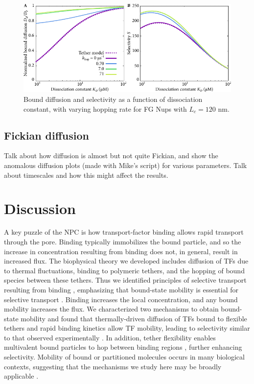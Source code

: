 \begin{figure}[h]
\centering
\includegraphics[width=0.7\linewidth]{figs/ch02/hopping_lc120-fig.pdf}
\caption{Bound diffusion and selectivity as a function of dissociation
  constant, with varying hopping rate for FG Nups with $L_c = 120$ nm.}
\label{fig:partitioningD}
\end{figure}

\subsection{Fickian diffusion}
Talk about how diffusion is almost but not quite Fickian, and show the anomalous diffusion plots (made with Mike's script) for various parameters. Talk about timescales and how this might affect the results.

\section{Discussion}
A key puzzle of the NPC is how transport-factor binding allows rapid transport through the pore.  Binding typically immobilizes the bound particle, and so the increase in concentration resulting from binding does not, in general, result in increased flux. The biophysical theory
we developed includes diffusion of TFs due to thermal fluctuations,
binding to polymeric tethers, and the hopping of bound species between
these tethers.  Thus we identified principles of selective transport
resulting from binding , emphasizing that
bound-state mobility is essential for selective transport
.  Binding increases the local concentration,
and any bound mobility increases the flux.  We characterized two
mechanisms to obtain bound-state mobility and found that
thermally-driven diffusion of TFs bound to flexible tethers and rapid
binding kinetics \cite{hough15, milles15} allow TF mobility, leading
to selectivity similar to that observed experimentally
.  In addition, tether flexibility enables
multivalent bound particles to hop between binding regions
 \cite{lowe15, schoch12}, further enhancing
selectivity. Mobility of bound or partitioned molecules occurs in many
biological contexts, suggesting that the mechanisms we study here may
be broadly applicable \cite{stefferson17, braga07}.


